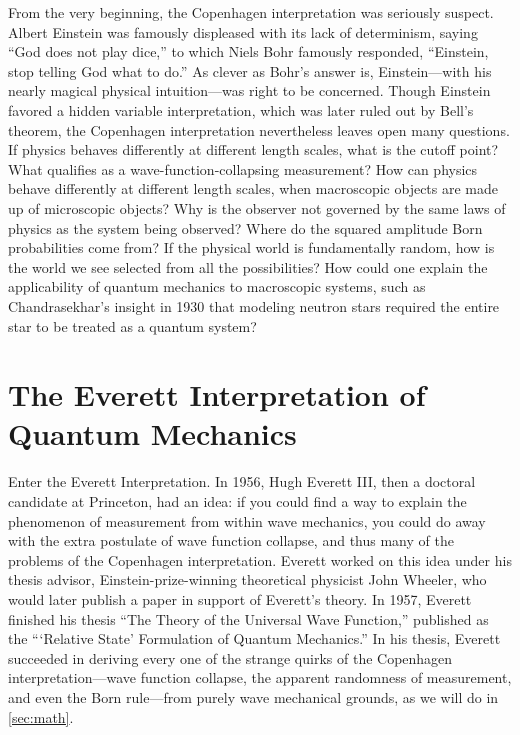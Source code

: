 \documentclass[
    12pt,
    letterpaper,
    aps,
    prd,
    longbibliography,
    twocolumn,
    nofootinbib,
    raggedbottom,
    amsmath,
    amssymb,
    amsfonts,
]{revtex4-1}
\begin{document}
From the very beginning, the Copenhagen interpretation was seriously suspect. Albert Einstein was famously displeased with its lack of determinism, saying ``God does not play dice,'' to which Niels Bohr famously responded, ``Einstein, stop telling God what to do.''\cite{solvay} As clever as Bohr's answer is, Einstein---with his nearly magical physical intuition---was right to be concerned. Though Einstein favored a hidden variable interpretation\cite{epr}, which was later ruled out by Bell's theorem\cite{bell}, the Copenhagen interpretation nevertheless leaves open many questions. If physics behaves differently at different length scales, what is the cutoff point? What qualifies as a wave-function-collapsing measurement? How can physics behave differently at different length scales, when macroscopic objects are made up of microscopic objects? Why is the observer not governed by the same laws of physics as the system being observed? Where do the squared amplitude Born probabilities come from? If the physical world is fundamentally random, how is the world we see selected from all the possibilities? How could one explain the applicability of quantum mechanics to macroscopic systems, such as Chandrasekhar's insight in 1930 that modeling neutron stars required the entire star to be treated as a quantum system?\cite{townsend}

\section{The Everett Interpretation of Quantum Mechanics}
\label{sec:everett}

Enter the Everett Interpretation. In 1956, Hugh Everett III, then a doctoral candidate at Princeton, had an idea: if you could find a way to explain the phenomenon of measurement from within wave mechanics, you could do away with the extra postulate of wave function collapse, and thus many of the problems of the Copenhagen interpretation. Everett worked on this idea under his thesis advisor, Einstein-prize-winning theoretical physicist John Wheeler, who would later publish a paper in support of Everett's theory.\cite{wheeler} In 1957, Everett finished his thesis ``The Theory of the Universal Wave Function,''\cite{everett} published as the ```Relative State' Formulation of Quantum Mechanics.''\cite{relativestate} In his thesis, Everett succeeded in deriving every one of the strange quirks of the Copenhagen interpretation---wave function collapse, the apparent randomness of measurement, and even the Born rule---from purely wave mechanical grounds, as we will do in \autoref{sec:math}.
\end{document}
